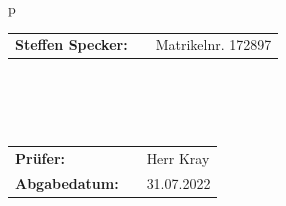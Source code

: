 \begin{titlepage}
\begin{center}
\begin{tabular}{p{\textwidth}}
\begin{center}
    \begin{tabular}{lll}
        \textbf{Steffen Specker:} & & Matrikelnr. 172897\\
        \end{tabular} 
\end{center}

\\

\\

\\

\begin{center}
\begin{tabular}{lll}
\textbf{Prüfer:} & & Herr Kray\\
\textbf{Abgabedatum:} & & 31.07.2022\\
\end{tabular}
\end{center}

\end{tabular}
\end{center}

\end{titlepage}